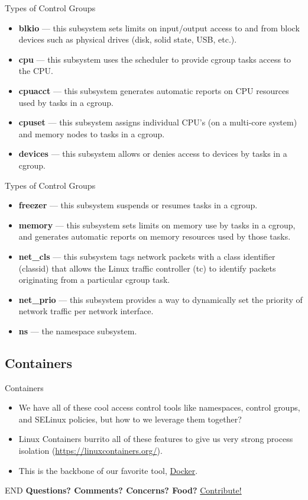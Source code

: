 \documentclass{beamer}
\begin{document}
\begin{frame}{Types of Control Groups}
\begin{itemize}
\item \textbf{blkio} — this subsystem sets limits on input/output access to and from block devices such as physical drives (disk, solid state, USB, etc.).
\item \textbf{cpu} — this subsystem uses the scheduler to provide cgroup tasks access to the CPU.
\item \textbf{cpuacct} — this subsystem generates automatic reports on CPU resources used by tasks in a cgroup.
\item \textbf{cpuset} — this subsystem assigns individual CPU's (on a multi-core system) and memory nodes to tasks in a cgroup.
\item \textbf{devices} — this subsystem allows or denies access to devices by tasks in a cgroup.
\end{itemize}
\end{frame}

\begin{frame}{Types of Control Groups}
\begin{itemize}
\item \textbf{freezer} — this subsystem suspends or resumes tasks in a cgroup.
\item \textbf{memory} — this subsystem sets limits on memory use by tasks in a cgroup, and generates automatic reports on memory resources used by those tasks.
\item \textbf{net\_cls} — this subsystem tags network packets with a class identifier (classid) that allows the Linux traffic controller (tc) to identify packets originating from a particular cgroup task.
\item \textbf{net\_prio} — this subsystem provides a way to dynamically set the priority of network traffic per network interface.
\item \textbf{ns} — the namespace subsystem. 
\end{itemize}
\end{frame}

\subsection{Containers}

\begin{frame}{Containers}
\begin{itemize}
\item We have all of these cool access control tools like namespaces, control groups, and SELinux policies, but how to we leverage them together?
\item Linux Containers burrito all of these features to give us very strong process isolation (\url{https://linuxcontainers.org/}).
\item This is the backbone of our favorite tool, \href{http://www.docker.com/}{Docker}.
\end{itemize}
\end{frame}

\begin{frame}{END}
\textbf{Questions? Comments? Concerns? Food?}
\vskip 20pt
\href{https://github.com/jacksonargo/access-control-presentation}{Contribute!}
\end{frame}
\end{document}
